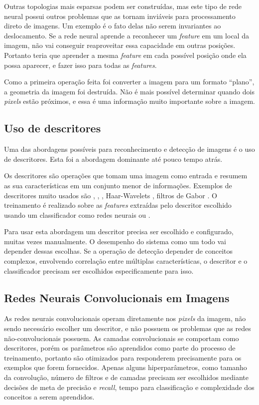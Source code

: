 Outras topologias mais esparsas podem ser construídas, mas este tipo de rede
neural possui outros problemas que as tornam inviáveis para processamento direto
de imagens. Um exemplo é o fato delas não serem invariantes ao deslocamento. Se
a rede neural aprende a reconhecer um \emph{feature} em um local da
imagem, não vai
conseguir reaproveitar essa capacidade em outras posições. Portanto teria que
aprender a mesma \emph{feature} em cada possível posição onde ela possa
aparecer, e fazer isso para todas as \emph{features}.

Como a primeira operação feita foi converter a imagem para um formato “plano”, a
geometria da imagem foi destruída. Não é mais possível determinar quando dois
\emph{pixels} estão próximos, e essa é uma informação muito importante sobre a
imagem.

\subsection{Uso de descritores}
Uma das abordagens possíveis para reconhecimento e detecção de imagens é o uso
de descritores. Esta foi a abordagem dominante até pouco tempo atrás.

Os descritores são operações que tomam uma imagem como entrada e resumem as sua
características em um conjunto menor de informações. Exemplos de descritores muito
usados são
	\cite{wang1990texture},
 \cite{rublee2011orb},
 \cite{dalal2005histograms},
Haar-Wavelets \cite{nabout2008object},
filtros de Gabor \cite{riaz2012invariant}.
O treinamento é realizado sobre
as \emph{features} extraídas pelo descritor escolhido usando um
classificador como redes neurais ou .

Para usar esta abordagem um descritor precisa ser escolhido e configurado,
muitas vezes manualmente. O desempenho do sistema como um todo vai depender
dessas escolhas. Se a operação de detecção depender de conceitos complexos,
envolvendo correlação entre múltiplas características, o descritor e o
classificador precisam ser escolhidos especificamente para isso.

\subsection{Redes Neurais Convolucionais em Imagens}
As redes neurais convolucionais operam diretamente nos \emph{pixels} da imagem,
não sendo necessário escolher um descritor, e não possuem os problemas que as
redes não-convolucionais possuem. As camadas convolucionais se comportam como
descritores, porém os parâmetros são aprendidos como parte do processo de
treinamento, portanto são otimizados para responderem precisamente para os
exemplos que forem fornecidos. Apenas alguns hiperparâmetros, como tamanho
da convolução, número de filtros e de camadas precisam ser escolhidos mediante
decisões de meta de precisão e \emph{recall}, tempo para classificação e
complexidade dos conceitos a serem aprendidos.

